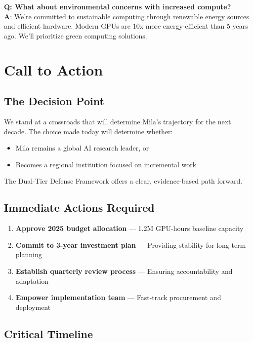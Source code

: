 \documentclass{article}
\begin{document}
\textbf{Q: What about environmental concerns with increased compute?}\\
\textbf{A}: We're committed to sustainable computing through renewable energy sources and efficient hardware. Modern GPUs are 10x more energy-efficient than 5 years ago. We'll prioritize green computing solutions.

\section{Call to Action}

\subsection{The Decision Point}

We stand at a crossroads that will determine Mila's trajectory for the next decade. The choice made today will determine whether:

\begin{itemize}
\item Mila remains a global AI research leader, or
\item Becomes a regional institution focused on incremental work
\end{itemize}

The Dual-Tier Defense Framework offers a clear, evidence-based path forward.

\subsection{Immediate Actions Required}

\begin{enumerate}
\item \textbf{Approve 2025 budget allocation} --- 1.2M GPU-hours baseline capacity
\item \textbf{Commit to 3-year investment plan} --- Providing stability for long-term planning
\item \textbf{Establish quarterly review process} --- Ensuring accountability and adaptation
\item \textbf{Empower implementation team} --- Fast-track procurement and deployment
\end{enumerate}

\subsection{Critical Timeline}
\end{document}
